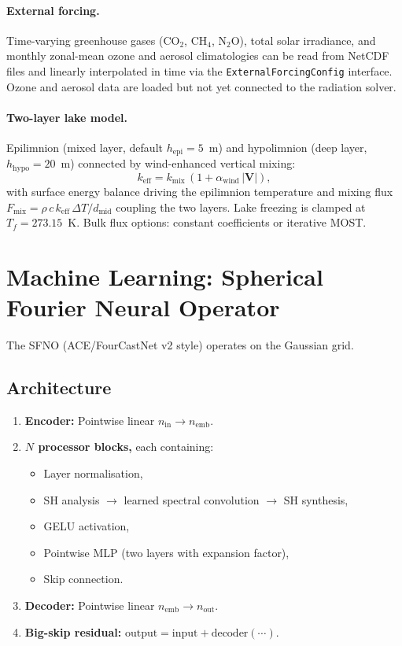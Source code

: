 \documentclass[11pt,a4paper]{article}
\begin{document}
\paragraph{External forcing.}
Time-varying greenhouse gases (CO$_2$, CH$_4$, N$_2$O), total solar irradiance, and monthly zonal-mean ozone and aerosol climatologies can be read from NetCDF files and linearly interpolated in time via the \texttt{ExternalForcingConfig} interface.  Ozone and aerosol data are loaded but not yet connected to the radiation solver.

\paragraph{Two-layer lake model.}
Epilimnion (mixed layer, default $h_{\mathrm{epi}}=5$~m) and hypolimnion (deep layer, $h_{\mathrm{hypo}}=20$~m) connected by wind-enhanced vertical mixing:
\begin{equation}
  k_{\mathrm{eff}} = k_{\mathrm{mix}}\,(1+\alpha_{\mathrm{wind}}\,|\bm V|),
\end{equation}
with surface energy balance driving the epilimnion temperature and mixing flux $F_{\mathrm{mix}}=\rho\,c\,k_{\mathrm{eff}}\,\Delta T/d_{\mathrm{mid}}$ coupling the two layers.  Lake freezing is clamped at $T_f=273.15$~K.  Bulk flux options: constant coefficients or iterative MOST.

\section{Machine Learning: Spherical Fourier Neural Operator}

The SFNO (ACE/FourCastNet v2 style) operates on the Gaussian grid.

\subsection{Architecture}
\begin{enumerate}[nosep]
  \item \textbf{Encoder:} Pointwise linear $n_{\mathrm{in}}\to n_{\mathrm{emb}}$.
  \item \textbf{$N$ processor blocks,} each containing:
    \begin{itemize}[nosep]
      \item Layer normalisation,
      \item SH analysis $\to$ learned spectral convolution $\to$ SH synthesis,
      \item GELU activation,
      \item Pointwise MLP (two layers with expansion factor),
      \item Skip connection.
    \end{itemize}
  \item \textbf{Decoder:} Pointwise linear $n_{\mathrm{emb}}\to n_{\mathrm{out}}$.
  \item \textbf{Big-skip residual:} $\text{output}=\text{input}+\text{decoder}(\cdots)$.
\end{enumerate}
\end{document}
